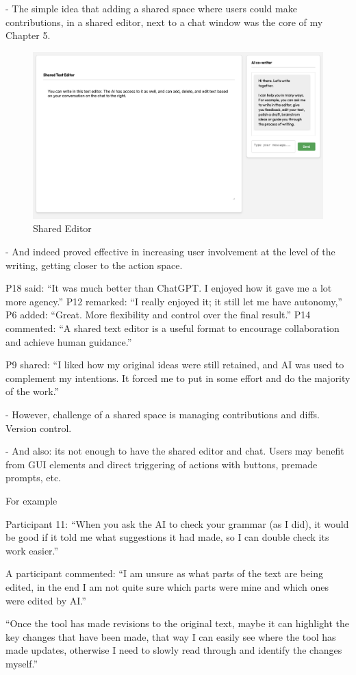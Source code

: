 - The simple idea that adding a shared space where users could make contributions, in a shared editor, next to a chat window was the core of my Chapter 5. 

\begin{figure}
    \centering
    \includegraphics[width=0.5\linewidth]{sharededitor.png}
    \caption{Shared Editor}
    \label{fig:enter-label}
\end{figure}

- And indeed proved effective in increasing user involvement at the level of the writing, getting closer to the action space. 

P18 said: “It was much better than ChatGPT. I enjoyed how it gave me a lot more agency.”
P12 remarked: “I really enjoyed it; it still let me have autonomy,”
P6 added: “Great. More flexibility and control over the final result.”
P14 commented: “A shared text editor is a useful format to encourage collaboration and achieve human guidance.”


P9 shared: “I liked how my original ideas were still retained, and AI was used to complement my intentions. It forced
me to put in some effort and do the majority of the work.”

- However, challenge of a shared space is managing contributions and diffs. Version control. 

- And also: its not enough to have the shared editor and chat. Users may benefit from GUI elements and direct triggering of actions with buttons, premade prompts, etc. 

For example

Participant 11: “When you ask the AI to check your grammar (as I did), it would be good if it told me what suggestions it had made, so I can double check its work easier.”

A participant commented:  “I am unsure as what parts of the text are being edited, in the end I am not quite sure which parts were mine and which ones were edited by AI.”

 “Once the tool has made revisions to the original text, maybe it can highlight the key
changes that have been made, that way I can easily see where the tool has made updates, otherwise I need to
slowly read through and identify the changes myself.”

